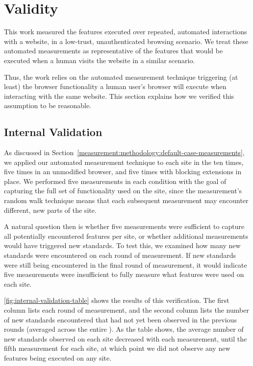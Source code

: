 \section{Validity}
\label{measurement:validity}

This work measured the features executed over repeated, automated interactions
with a website, in a low-trust, unauthenticated browsing scenario.  We treat
these automated measurements as representative of the features that would be
executed when a human visits the website in a similar scenario.

Thus, the work relies on the automated measurement technique
triggering (at least) the browser functionality a human user's browser will
execute when interacting with the same website. This section explains how we
verified this assumption to be reasonable.


\subsection{Internal Validation}
\label{measurement:validity:internal-validation}

As discussed in
Section~\ref{measurement:methodology:default-case-measurements}, we applied our
automated measurement technique to each site in the \ATK ten times, five
times in an unmodified browser, and five times with blocking extensions in
place.  We performed five measurements in each condition with the goal of
capturing the full set of functionality used on the site, since the
measurement's random walk technique means that each subsequent measurement may
encounter different, new parts of the site.

A natural question then is whether five measurements were sufficient to capture
all potentially encountered features per site, or whether additional
measurements would have triggered new standards.  To test this, we examined how
many new standards were encountered on each round of measurement.  If new
standards were still being encountered in the final round of measurement, it
would indicate five measurements were insufficient to fully measure what
features were used on each site.

\ref{fig:internal-validation-table} shows the results of this verification.
The first column lists each round of measurement, and the second column lists
the number of new standards encountered that had not yet been observed in the
previous rounds (averaged across the entire \ATK).  As the table shows,
the average number of new standards observed on each site decreased with each
measurement, until the fifth measurement for each site, at which point we did
not observe any new features being executed on any site.

